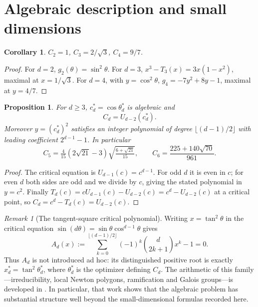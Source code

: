\documentclass[11pt]{article}
\newtheorem{proposition}[theorem]{Proposition}
\newtheorem{corollary}[theorem]{Corollary}
\theoremstyle{definition}\newtheorem{definition}[theorem]{Definition}
\theoremstyle{remark}\newtheorem{remark}[theorem]{Remark}
\begin{document}
\section{Algebraic description and small dimensions}
\begin{corollary}\label{cor:small}
$C_2=1$, $C_3=2/\sqrt3$, $C_4=9/7$.
\end{corollary}
\begin{proof}
For $d=2$, $g_2(\theta)=\sin^2\theta$. For $d=3$, $x^3-T_3(x)=3x(1-x^2)$, maximal at $x=1/\sqrt3$. For $d=4$,
with $y=\cos^2\theta$, $g_4=-7y^2+8y-1$, maximal at $y=4/7$.
\end{proof}

\begin{proposition}\label{prop:alg}
For $d\ge3$, $c_d^*=\cos\theta_d^*$ is algebraic and
\[
\boxed{C_d=U_{d-2}(c_d^*).}
\]
Moreover $y=(c_d^*)^2$ satisfies an integer polynomial of degree $\lfloor(d-1)/2\rfloor$ with leading coefficient
$2^{d-1}-1$. In particular
\[
C_5=\tfrac4{15}(2\sqrt{21}-3)\sqrt{\tfrac{6+\sqrt{21}}{15}},\qquad
C_6=\frac{225+140\sqrt{70}}{961}.
\]
\end{proposition}
\begin{proof}
The critical equation is $U_{d-1}(c)=c^{d-1}$. For odd $d$ it is even in $c$; for even $d$ both sides are odd and we
divide by $c$, giving the stated polynomial in $y=c^2$. Finally
$T_d(c)=cU_{d-1}(c)-U_{d-2}(c)=c^d-U_{d-2}(c)$ at a critical point, so
$C_d=c^d-T_d(c)=U_{d-2}(c)$.
\end{proof}

\begin{remark}[The tangent-square critical polynomial]\label{rem:criticalpoly}
Writing $x=\tan^2\theta$ in the critical equation $\sin(d\theta)=\sin\theta\cos^{d-1}\theta$ gives
\[
 A_d(x):=\sum_{k=0}^{\lfloor(d-1)/2\rfloor}(-1)^k\binom d{2k+1}x^k-1=0.
\]
Thus $A_d$ is not introduced ad hoc: its distinguished positive root is exactly
$x_d^*=\tan^2\theta_d^*$, where $\theta_d^*$ is the optimizer defining $C_d$.
The arithmetic of this family---irreducibility, local Newton polygons, ramification and Galois groups---is developed
in \cite{MartinevskiCritical}. In particular, that work shows that the algebraic problem has substantial structure
well beyond the small-dimensional formulas recorded here.
\end{remark}
\end{document}
